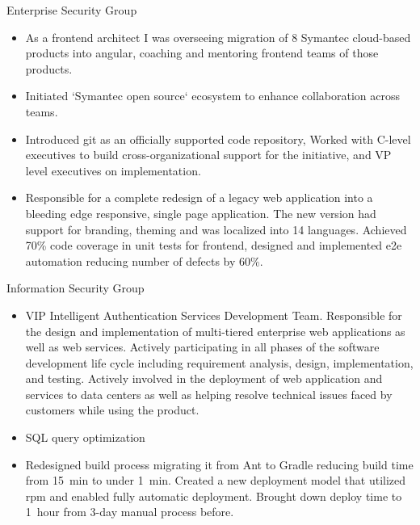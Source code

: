 \documentclass[11pt,a4paper,roman]{moderncv}       %
\begin{document}
\bigskip
\pagebreak


Enterprise Security Group
\begin{itemize}
    \item As a frontend architect I was overseeing migration of 8 Symantec cloud-based products into angular, coaching and mentoring frontend teams of those products. 
    \item Initiated `Symantec open source` ecosystem to enhance collaboration across teams. 
    \item Introduced git as an officially supported code repository, Worked with C-level executives to build cross-organizational support for the initiative, and VP level executives on implementation.
    \item Responsible for a complete redesign of a legacy web application into a bleeding edge responsive, single page application. The new version had support for branding, theming and was localized into 14 languages. Achieved 70\% code coverage in unit tests for frontend, designed and implemented e2e automation reducing number of defects by 60\%.
\end{itemize}

\medskip

Information Security Group

\begin{itemize}
    \item VIP Intelligent Authentication Services Development Team. Responsible for the design and implementation of multi-tiered enterprise web applications as well as web services. Actively participating in all phases of the software development life cycle including requirement analysis, design, implementation, and testing. Actively involved in the deployment of web application and services to data centers as well as helping resolve technical issues faced by customers while using the product.
    \item SQL query optimization
    \item Redesigned build process migrating it from Ant to Gradle reducing build time from 15~min to under 1~min. Created a new deployment model that utilized rpm and enabled fully automatic deployment. Brought down deploy time to 1~hour from 3-day manual process before.
\end{itemize}

\medskip
\end{document}
